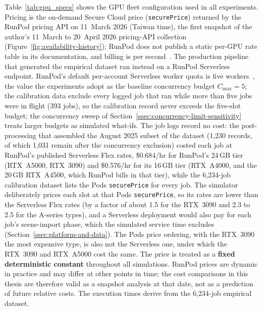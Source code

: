 Table~\ref{tab:gpu_specs} shows the GPU fleet configuration used in all experiments. Pricing is the on-demand Secure Cloud price (\texttt{securePrice}) returned by the RunPod pricing API on 11~March 2026 (Taiwan time), the first snapshot of the author's 11~March to 20~April 2026 pricing-API collection (Figure~\ref{fig:availability-history}); RunPod does not publish a static per-GPU rate table in its documentation, and billing is per second~\cite{runpod2026podspricing}. The production pipeline that generated the empirical dataset ran instead on a RunPod Serverless endpoint. RunPod's default per-account Serverless worker quota is five workers~\cite{runpod2026maxworkers}, the value the experiments adopt as the baseline concurrency budget $C_{\max}=5$; the calibration data exclude every logged job that ran while more than five jobs were in flight (393 jobs), so the calibration record never exceeds the five-slot budget; the concurrency sweep of Section~\ref{ssec:concurrency-limit-sensitivity} treats larger budgets as simulated what-ifs. The job logs record no cost: the post-processing that assembled the August 2025 subset of the dataset (1,230 records, of which 1,031 remain after the concurrency exclusion) costed each job at RunPod's published Serverless Flex rates, \$0.684/hr for RunPod's 24\,GB tier (RTX~A5000, RTX~3090) and \$0.576/hr for its 16\,GB tier (RTX~A4000, and the 20\,GB RTX~A4500, which RunPod bills in that tier), while the 6,234-job calibration dataset lists the Pods \texttt{securePrice} for every job. The simulator deliberately prices each slot at that Pods \texttt{securePrice}, so its rates are lower than the Serverless Flex rates (by a factor of about 1.5 for the RTX~3090 and 2.3 to 2.5 for the A-series types), and a Serverless deployment would also pay for each job's scene-import phase, which the simulated service time excludes (Section~\ref{ssec:platform-and-data}). The Pods price ordering, with the RTX~3090 the most expensive type, is also not the Serverless one, under which the RTX~3090 and RTX~A5000 cost the same. The price is treated as a \textbf{fixed deterministic constant} throughout all simulations. RunPod prices are dynamic in practice and may differ at other points in time; the cost comparisons in this thesis are therefore valid as a snapshot analysis at that date, not as a prediction of future relative costs. The execution times derive from the 6,234-job empirical dataset.

